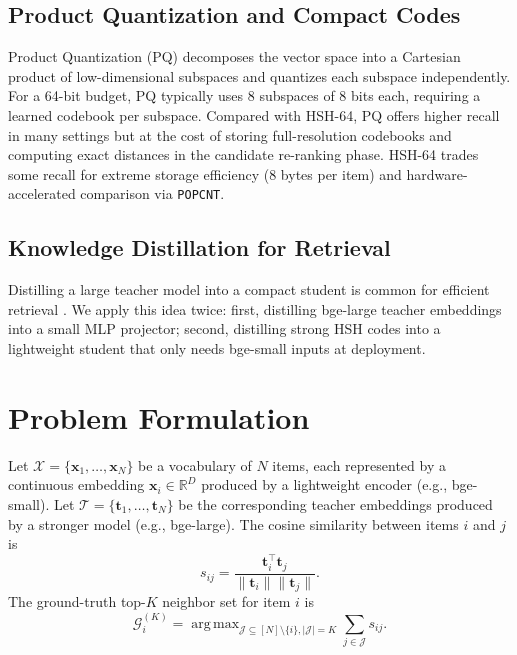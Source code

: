 \documentclass[11pt,a4paper]{article}
\DeclareMathOperator*{\argmax}{arg\,max}
\begin{document}
\subsection{Product Quantization and Compact Codes}

Product Quantization (PQ) \citep{jegou2011product} decomposes the vector space into a Cartesian product of low-dimensional subspaces and quantizes each subspace independently. For a 64-bit budget, PQ typically uses 8 subspaces of 8 bits each, requiring a learned codebook per subspace. Compared with HSH-64, PQ offers higher recall in many settings but at the cost of storing full-resolution codebooks and computing exact distances in the candidate re-ranking phase. HSH-64 trades some recall for extreme storage efficiency (8 bytes per item) and hardware-accelerated comparison via \texttt{POPCNT}.

\subsection{Knowledge Distillation for Retrieval}

Distilling a large teacher model into a compact student is common for efficient retrieval \citep{hinton2015distilling,izacard2020distilling}. We apply this idea twice: first, distilling bge-large teacher embeddings into a small MLP projector; second, distilling strong HSH codes into a lightweight student that only needs bge-small inputs at deployment.

\section{Problem Formulation}

Let $\mathcal{X} = \{\mathbf{x}_1, \dots, \mathbf{x}_N\}$ be a vocabulary of $N$ items, each represented by a continuous embedding $\mathbf{x}_i \in \mathbb{R}^D$ produced by a lightweight encoder (e.g., bge-small). Let $\mathcal{T} = \{\mathbf{t}_1, \dots, \mathbf{t}_N\}$ be the corresponding teacher embeddings produced by a stronger model (e.g., bge-large). The cosine similarity between items $i$ and $j$ is
\begin{equation}
    s_{ij} = \frac{\mathbf{t}_i^\top \mathbf{t}_j}{\| \mathbf{t}_i \| \| \mathbf{t}_j \|}.
\end{equation}
The ground-truth top-$K$ neighbor set for item $i$ is
\begin{equation}
    \mathcal{G}_i^{(K)} = \argmax_{\mathcal{J} \subseteq [N] \setminus \{i\}, |\mathcal{J}|=K} \sum_{j \in \mathcal{J}} s_{ij}.
\end{equation}
\end{document}
